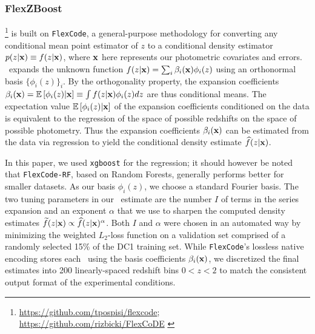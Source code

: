 \subsubsection{FlexZBoost}

\flexzboost \footnote{\url{https://github.com/tpospisi/flexcode};\\ \url{https://github.com/rizbicki/FlexCoDE} \label{flexzboost_github}} \citep{Izbicki:17} is built on \texttt{FlexCode}, a general-purpose methodology for converting any conditional mean point estimator of $z$ to a conditional density estimator $p(z \vert {\mathbf{x}}) \equiv f(z \vert {\mathbf{x}})$, where ${\mathbf{x}}$ here represents our photometric covariates and errors.
\flexzboost\ expands the unknown function $f(z \vert {\mathbf{x}}) = \sum_{i}\beta_{i}({\mathbf{x}})\phi_{i}(z)$ using an orthonormal basis $\{\phi_{i}(z)\}_{i}$.
By the orthogonality property, the expansion coefficients $\beta_{i}({\mathbf{x}}) = \mathbb{E}\left[\phi_i(z)|{\mathbf{x}}\right] \equiv \int f(z \vert {\mathbf{x}}) \phi_{i}(z) dz$ are thus conditional means.
The expectation value $\mathbb{E}\left[\phi_i(z) \vert {\mathbf{x}}\right]$ of the expansion coefficients conditioned on the data is equivalent to the regression of the space of possible redshifts on the space of possible photometry.
Thus the expansion coefficients $\beta_{i}({\mathbf{x}})$ can be estimated from the data via regression to yield the conditional density estimate $\widehat{f}(z \vert {\mathbf{x}})$.

In this paper, we used \texttt{xgboost} \citep{Chen:16} for the regression; it should however be noted that \texttt{FlexCode-RF}, based on Random Forests, generally performs better for smaller datasets.
As our basis $\phi_{i}(z)$, we choose a standard Fourier basis.
The two tuning parameters in our \pzpdf\ estimate are the number $I$ of terms in the series expansion and an exponent $\alpha$ that we use to sharpen the computed density estimates $\widetilde{f}(z \vert {\mathbf{x}}) \propto \widehat{f}(z \vert {\mathbf{x}})^{\alpha}$.
Both $I$ and $\alpha$ were chosen in an automated way by minimizing the weighted $L_2$-loss function \citep[Eq. 5 in][]{Izbicki:17} on a validation set comprised of a randomly selected 15\% of the DC1 training set.
While \texttt{FlexCode}'s lossless native encoding stores each \pzpdf\ using the basis coefficients $\beta_{i}({\mathbf{x}})$, we discretized the final estimates into 200 linearly-spaced redshift bins $0 < z < 2$ to match the consistent output format of the experimental conditions.

%
%

